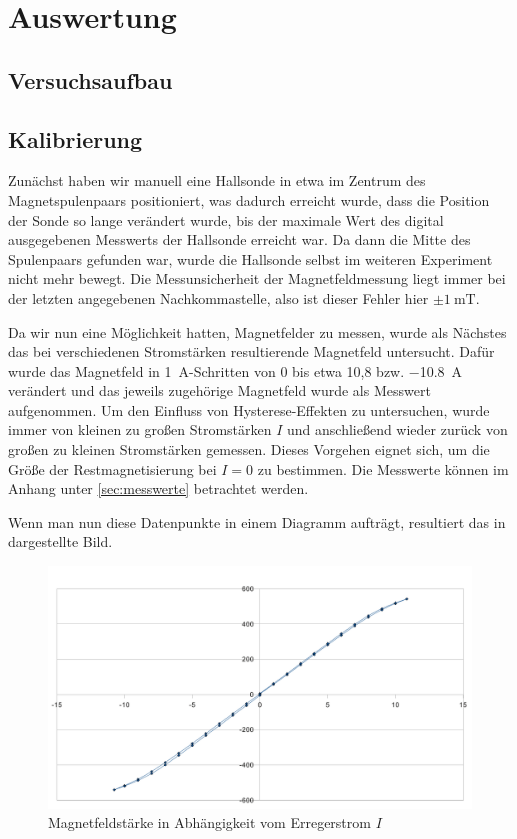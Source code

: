 \section{Auswertung}
\subsection{Versuchsaufbau}

\subsection{Kalibrierung}
Zunächst haben wir manuell eine Hallsonde in etwa im Zentrum des
Magnetspulenpaars positioniert, was dadurch erreicht wurde, dass die Position
der Sonde so lange verändert wurde, bis der maximale Wert des digital
ausgegebenen Messwerts der Hallsonde erreicht war. Da dann die Mitte des
Spulenpaars gefunden war, wurde die Hallsonde selbst im weiteren Experiment
nicht mehr bewegt. Die Messunsicherheit der Magnetfeldmessung liegt immer bei
der letzten angegebenen Nachkommastelle, also ist dieser Fehler hier $\pm
\SI{1}{\milli\tesla}$.

Da wir nun eine Möglichkeit hatten, Magnetfelder zu messen, wurde als Nächstes
das bei verschiedenen Stromstärken resultierende Magnetfeld untersucht. Dafür
wurde das Magnetfeld in \SI{1}{\ampere}-Schritten von 0 bis etwa 10,8 bzw.
\SI{-10,8}{\ampere} verändert und das jeweils
zugehörige Magnetfeld wurde als Messwert aufgenommen. Um den Einfluss von
Hysterese-Effekten zu untersuchen, wurde immer von kleinen zu großen
Stromstärken $I$ und anschließend wieder zurück von großen zu kleinen
Stromstärken gemessen. Dieses Vorgehen eignet sich, um die Größe der
Restmagnetisierung bei $I=0$ zu bestimmen. Die Messwerte können im Anhang unter
\ref{sec:messwerte} betrachtet werden. 

Wenn man nun diese Datenpunkte in einem Diagramm aufträgt, resultiert das in
 dargestellte Bild.

\begin{figure}[htb]
   \centering
   \includegraphics[width=1\columnwidth,keepaspectratio]{hysterese.png}
   \caption{Magnetfeldstärke in Abhängigkeit vom Erregerstrom $I$}
   \label{fig:hysterese}
\end{figure}

